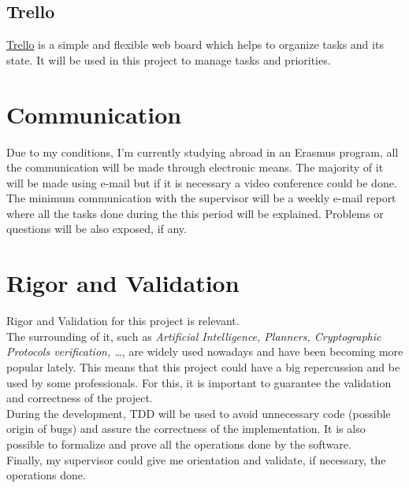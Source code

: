 \subsection{Trello}
\href{https://trello.com}{Trello} is a simple and flexible web board which helps to organize tasks and its state. It will be used in this project to manage tasks and priorities.  

\section{Communication}
Due to my conditions, I'm currently studying abroad in an Erasmus program, all the communication will be made through electronic means. The majority of it will be made using e-mail but if it is necessary a video conference could be done. \\
The minimum communication with the supervisor will be a weekly e-mail report where all the tasks done during the this period will be explained. Problems or questions will be also exposed, if any.

\section{Rigor and Validation}
Rigor and Validation for this project is relevant. \\
The surrounding of it, such as \emph{Artificial Intelligence, Planners, Cryptographic Protocols verification, \ldots}, are widely used nowadays and have been becoming more popular lately. This means that this project could have a big repercussion and be used by some professionals. For this, it is important to guarantee the validation and correctness of the project. \\
During the development, TDD will be used to avoid unnecessary code (possible origin of bugs) and assure the correctness of the implementation. It is also possible to formalize and prove all the operations done by the software.\\
Finally, my supervisor could give me orientation and validate, if necessary, the operations done.